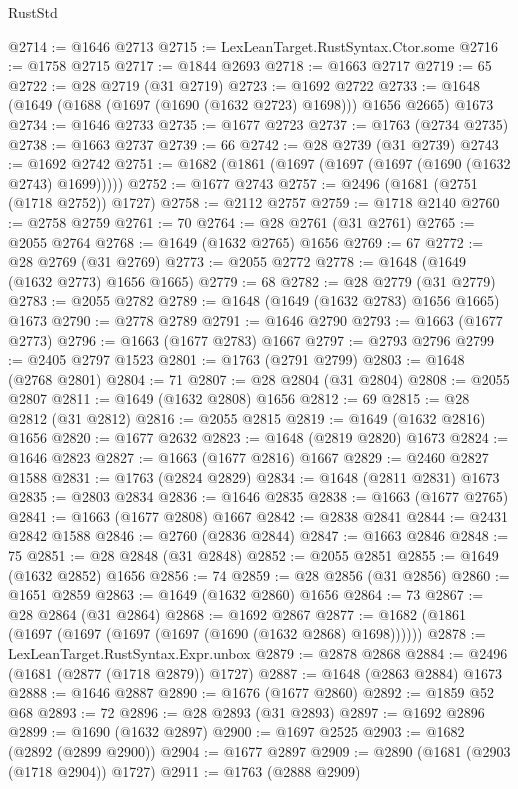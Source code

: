 \begin{lexlean}{RustStd}
\begin{coremodule}
@2714 := @1646 @2713
@2715 := LexLeanTarget.RustSyntax.Ctor.some
@2716 := @1758 @2715
@2717 := @1844 @2693
@2718 := @1663 @2717
@2719 := 65
@2722 := @28 @2719 (@31 @2719)
@2723 := @1692 @2722
@2733 := @1648 (@1649 (@1688 (@1697 (@1690 (@1632 @2723) @1698))) @1656 @2665) @1673
@2734 := @1646 @2733
@2735 := @1677 @2723
@2737 := @1763 (@2734 @2735)
@2738 := @1663 @2737
@2739 := 66
@2742 := @28 @2739 (@31 @2739)
@2743 := @1692 @2742
@2751 := @1682 (@1861 (@1697 (@1697 (@1697 (@1690 (@1632 @2743) @1699)))))
@2752 := @1677 @2743
@2757 := @2496 (@1681 (@2751 (@1718 @2752)) @1727)
@2758 := @2112 @2757
@2759 := @1718 @2140
@2760 := @2758 @2759
@2761 := 70
@2764 := @28 @2761 (@31 @2761)
@2765 := @2055 @2764
@2768 := @1649 (@1632 @2765) @1656
@2769 := 67
@2772 := @28 @2769 (@31 @2769)
@2773 := @2055 @2772
@2778 := @1648 (@1649 (@1632 @2773) @1656 @1665)
@2779 := 68
@2782 := @28 @2779 (@31 @2779)
@2783 := @2055 @2782
@2789 := @1648 (@1649 (@1632 @2783) @1656 @1665) @1673
@2790 := @2778 @2789
@2791 := @1646 @2790
@2793 := @1663 (@1677 @2773)
@2796 := @1663 (@1677 @2783) @1667
@2797 := @2793 @2796
@2799 := @2405 @2797 @1523
@2801 := @1763 (@2791 @2799)
@2803 := @1648 (@2768 @2801)
@2804 := 71
@2807 := @28 @2804 (@31 @2804)
@2808 := @2055 @2807
@2811 := @1649 (@1632 @2808) @1656
@2812 := 69
@2815 := @28 @2812 (@31 @2812)
@2816 := @2055 @2815
@2819 := @1649 (@1632 @2816) @1656
@2820 := @1677 @2632
@2823 := @1648 (@2819 @2820) @1673
@2824 := @1646 @2823
@2827 := @1663 (@1677 @2816) @1667
@2829 := @2460 @2827 @1588
@2831 := @1763 (@2824 @2829)
@2834 := @1648 (@2811 @2831) @1673
@2835 := @2803 @2834
@2836 := @1646 @2835
@2838 := @1663 (@1677 @2765)
@2841 := @1663 (@1677 @2808) @1667
@2842 := @2838 @2841
@2844 := @2431 @2842 @1588
@2846 := @2760 (@2836 @2844)
@2847 := @1663 @2846
@2848 := 75
@2851 := @28 @2848 (@31 @2848)
@2852 := @2055 @2851
@2855 := @1649 (@1632 @2852) @1656
@2856 := 74
@2859 := @28 @2856 (@31 @2856)
@2860 := @1651 @2859
@2863 := @1649 (@1632 @2860) @1656
@2864 := 73
@2867 := @28 @2864 (@31 @2864)
@2868 := @1692 @2867
@2877 := @1682 (@1861 (@1697 (@1697 (@1697 (@1697 (@1690 (@1632 @2868) @1698))))))
@2878 := LexLeanTarget.RustSyntax.Expr.unbox
@2879 := @2878 @2868
@2884 := @2496 (@1681 (@2877 (@1718 @2879)) @1727)
@2887 := @1648 (@2863 @2884) @1673
@2888 := @1646 @2887
@2890 := @1676 (@1677 @2860)
@2892 := @1859 @52 @68
@2893 := 72
@2896 := @28 @2893 (@31 @2893)
@2897 := @1692 @2896
@2899 := @1690 (@1632 @2897)
@2900 := @1697 @2525
@2903 := @1682 (@2892 (@2899 @2900))
@2904 := @1677 @2897
@2909 := @2890 (@1681 (@2903 (@1718 @2904)) @1727)
@2911 := @1763 (@2888 @2909)

\end{coremodule}
\end{lexlean}
